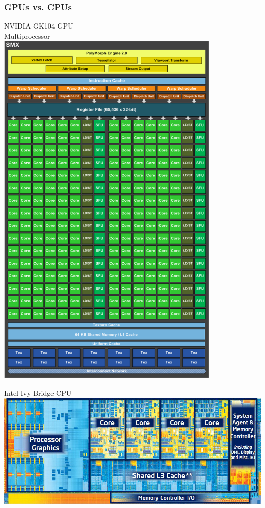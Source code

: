 \documentclass{beamer}
\begin{document}
\begin{frame}[t]
  \frametitle{GPUs vs. CPUs}
  \vspace{0.5cm}
   \begin{minipage}[t]{0.40\linewidth}
    NVIDIA GK104 GPU\\
    Multiprocessor\vspace{0.15cm}\\
    \includegraphics[width=0.8\textwidth]{graphics/nvidia_kepler_gk104_sm.pdf}
  \end{minipage}
  \begin{minipage}[t]{0.55\linewidth}
     Intel Ivy Bridge CPU\vspace{0.15cm}\\
    \includegraphics[width=\textwidth]{graphics/Intel-3rd-Generation-Ivy-Bridge-Processor.jpg}

\end{minipage}
\end{frame}
\end{document}
